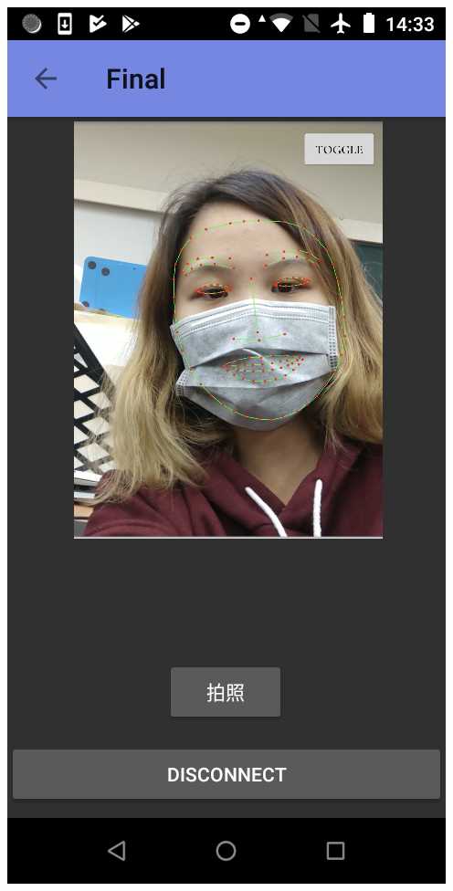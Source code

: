 \documentclass[a0paper,portrait]{baposter}
\begin{document}
\begin{poster}
{\begin{itemize}
\includegraphics[scale=0.23]{game03.png}
\end{itemize}
}



\end{poster}
\end{document}
